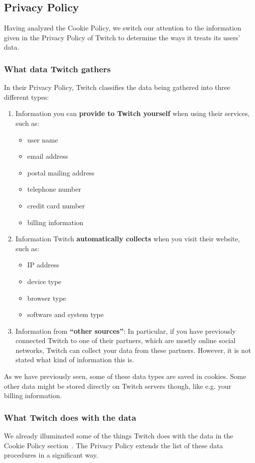 \subsection{Privacy Policy} \label{section:privacy-policy}
Having analyzed the Cookie Policy, we switch our attention to the information given in the Privacy Policy of Twitch to determine the ways it treats its users' data. 

\subsubsection{What data Twitch gathers}
In their Privacy Policy, Twitch classifies the data being gathered into three different types:
\begin{enumerate}
	\item Information you can \textbf{provide to Twitch yourself} when using their services, such as:
	\begin{itemize}
		\item user name
		\item email address
		\item postal mailing address
		\item telephone number
		\item credit card number
		\item billing information
	\end{itemize} 
	\item Information Twitch \textbf{automatically collects} when you visit their website, such as: 
	\begin{itemize}
		\item IP address
		\item device type
		\item browser type
		\item software and system type
	\end{itemize}
	\item Information from \textbf{``other sources''}: In particular, if you have previously connected Twitch to one of their partners, which are mostly online social networks, Twitch can collect your data from these partners. However, it is not stated what kind of information this is. 
\end{enumerate} 

As we have previously seen, some of these data types are saved in cookies. Some other data might be stored directly on Twitch servers though, like e.g. your billing information. 

\subsubsection{What Twitch does with the data}
We already illuminated some of the things Twitch does with the data in the Cookie Policy section~. The Privacy Policy extends the list of these data procedures in a significant way. 
 

